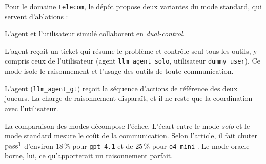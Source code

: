 Pour le domaine \texttt{telecom}, le dépôt propose deux variantes du mode standard, qui servent d'ablations :
\begin{description}[nosep]
  \item[Standard] L'agent et l'utilisateur simulé collaborent en \emph{dual-control}.
  \item[Sans utilisateur (\emph{solo})] L'agent reçoit un ticket qui résume le problème et contrôle seul tous les outils, y compris ceux de l'utilisateur (agent \texttt{llm\_agent\_solo}, utilisateur \texttt{dummy\_user}). Ce mode isole le raisonnement et l'usage des outils de toute communication.
  \item[Plan oracle] L'agent (\texttt{llm\_agent\_gt}) reçoit la séquence d'actions de référence des deux joueurs. La charge de raisonnement disparaît, et il ne reste que la coordination avec l'utilisateur.
\end{description}
La comparaison des modes décompose l'échec. L'écart entre le mode \emph{solo} et le mode standard mesure le coût de la communication. Selon l'article, il fait chuter $\text{pass}^{1}$ d'environ 18\,\% pour \texttt{gpt-4.1} et de 25\,\% pour \texttt{o4-mini} \cite{barres2025tau2}. Le mode oracle borne, lui, ce qu'apporterait un raisonnement parfait.
